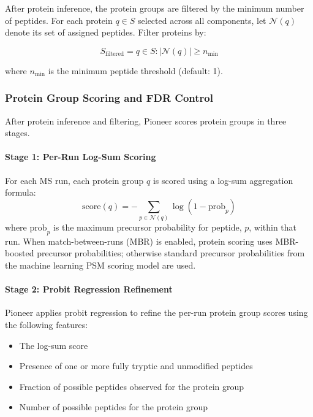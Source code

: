 \documentclass[pdflatex,sn-nature]{sn-jnl}
\begin{document}
After protein inference, the protein groups are filtered by the minimum number of peptides. For each protein $q \in S$ selected across all components, let $\mathcal{N}(q)$ denote its set of assigned peptides. Filter proteins by:

\begin{equation}
S_{\text{filtered}} = q \in S : |\mathcal{N}(q)| \geq n_{\text{min}}
\end{equation}

where $n_{\text{min}}$ is the minimum peptide threshold (default: 1).

\subsubsection{Protein Group Scoring and FDR Control}\label{subsubsec:protein-group-scoring-fdr}

After protein inference and filtering, Pioneer scores protein groups in three stages. 

\paragraph{Stage 1: Per-Run Log-Sum Scoring}\label{para:stage1-per-run-log-sum-scoring} For each MS run, each protein group $q$ is scored using a log-sum aggregation formula:
\begin{equation}
\text{score}(q) = -\sum_{p \in \mathcal{N}(q)} \log(1 - \text{prob}_p)
\end{equation}
where $\text{prob}_p$ is the maximum precursor probability for peptide, $p$, within that run. When match-between-runs (MBR) is enabled, protein scoring uses MBR-boosted precursor probabilities; otherwise standard precursor probabilities from the machine learning PSM scoring model are used.

\paragraph{Stage 2: Probit Regression Refinement}\label{para:stage2-probit-regression-refinement} Pioneer applies probit regression to refine the per-run protein group scores using the following features:
\begin{itemize}
  \item The log-sum score 
  \item Presence of one or more fully tryptic and unmodified peptides
  \item Fraction of possible peptides observed for the protein group 
  \item Number of possible peptides for the protein group
\end{itemize}
\end{document}
